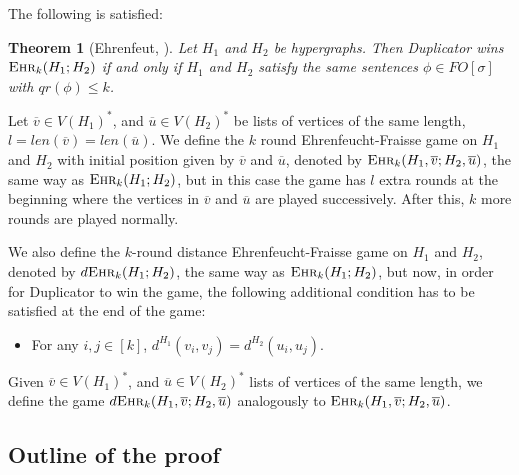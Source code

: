 \documentclass[12pt,notitlepage,a4paper]{article}
\newtheorem{theorem}{Theorem}[section]
\theoremstyle{definition}
\newcommand{\ehr}{\textsc{Ehr}}
\begin{document}
The following is satisfied:

\begin{theorem}
	[Ehrenfeut, \citealp{ehrenfeucht1961application}] Let
	$H_1$ and $H_2$ be hypergraphs.
	Then Duplicator wins $\ehr_k(H_1;H_2)$
	if and only if $H_1$ and $H_2$ satisfy the same 
	sentences $\phi\in FO[\sigma]$ with $qr(\phi)\leq k$.		
\end{theorem}

Let $\overline{v}\in V(H_1)^*$, and 
$\overline{u}\in V(H_2)^*$ be lists of vertices of the same length, 
$l=len(\overline{v})=len(\overline{u})$. We define the $k$ round 
Ehrenfeucht-Fraisse game on $H_1$ and $H_2$ with initial position given
by $\overline{v}$ and $\overline{u}$, denoted by $\ehr_k(H_1,\overline{v};H_2,\overline{u})$,
the same way as $\ehr_k(H_1;H_2)$, but in this case the game has $l$ extra 
rounds at the beginning where the vertices in $\overline{v}$ and $\overline{u}$ are 
played successively. After this, $k$ more rounds are played normally. \par

We also define the $k$-round distance Ehrenfeucht-Fraisse game on 
$H_1$ and $H_2$, denoted by $d\ehr_k(H_1;H_2)$, the same way as
$\ehr_k(H_1;H_2)$, but now, in order for Duplicator to win the
game, the following additional condition has to be satisfied 
at the end of the game:
\begin{itemize}
	\item For any $i,j\in [k]$, $d^{H_1}(v_i,v_j)=d^{H_2}(u_i,u_j)$.
\end{itemize}

Given $\overline{v}\in V(H_1)^*$, and $\overline{u}\in V(H_2)^*$
lists of vertices of the same length,
we define the game 
$d\ehr_k(H_1,\overline{v};H_2,\overline{u})$ analogously to 
$\ehr_k(H_1,\overline{v};H_2,\overline{u})$.



\subsection{Outline of the proof}
\end{document}
